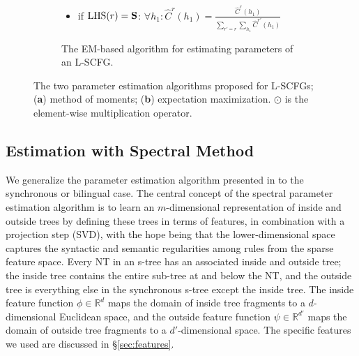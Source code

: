 \documentclass[11pt]{article}
\newcommand{\e}[1]{\hat{#1}}
\newcommand{\bS}{{\bf S}}
\newcommand{\cjd}[1]{\textcolor{red}{\textbf{[#1 --CJD] }}}
\begin{document}
\begin{figure}[t!]
{\begin{footnotesize}
\begin{subfigure}{1.05\columnwidth}
\begin{itemize}
\begin{itemize}[label={},nolistsep]
				\item if $\textrm{LHS}(r) = \bS$: $\forall h_1: \e{C}^r(h_1) = \frac{\e{C}^r(h_1)}{\sum_{r'=r} \sum_{h_1}\e{C}^{r'}(h_1)}$ 
			\end{itemize}
	\end{itemize}		
	\caption{\small The EM-based algorithm for estimating parameters of an L-SCFG.}
	\label{fig:emlearn}	
	\end{subfigure}		
	\end{footnotesize}}
	\caption{The two parameter estimation algorithms proposed for L-SCFGs; (\textbf{a}) method of moments; (\textbf{b}) expectation maximization. $\odot$ is the element-wise multiplication operator.
	}
	\vspace{-0.2cm}
	\label{fig:estimation-algos}
\end{figure}

\subsection{Estimation with Spectral Method}
\label{sec:spectral} 
We generalize the parameter estimation algorithm presented in  to the synchronous or bilingual case. 
The central concept of the spectral parameter estimation algorithm is to learn an $m$-dimensional representation of inside and outside trees by defining these trees in terms of features, in combination with a projection step (SVD), with the hope being that the lower-dimensional space captures the syntactic and semantic regularities among rules from the sparse feature space. 
Every NT in an s-tree has an associated inside and outside tree; the inside tree contains the entire sub-tree at and below the NT, and the outside tree is everything else in the synchronous s-tree except the inside tree.   
The inside feature function $\phi \in \mathbb{R}^d$ maps the domain of inside tree fragments to a $d$-dimensional Euclidean space, and the outside feature function $\psi \in \mathbb{R}^{d'}$ maps the domain of outside tree fragments to a $d'$-dimensional space. 
The specific features we used are discussed in \S\ref{sec:features}.  
\end{document}
